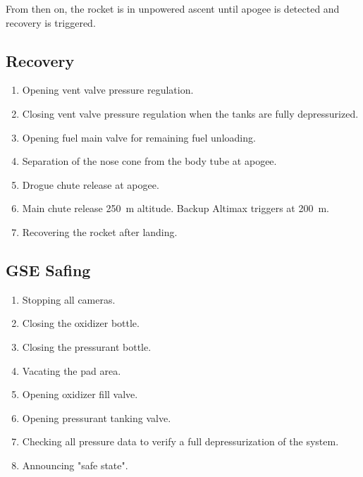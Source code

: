 From then on, the rocket is in unpowered ascent until apogee is detected and recovery is triggered.

\subsection{Recovery}
\begin{enumerate}
\item Opening vent valve pressure regulation.
\item Closing vent valve pressure regulation when the tanks are fully depressurized.
\item Opening fuel main valve for remaining fuel unloading.
\item Separation of the nose cone from the body tube at apogee.
\item Drogue chute release at apogee.
\item Main chute release \SI{250}{\meter} altitude. Backup Altimax triggers at \SI{200}{\meter}.
\item Recovering the rocket after landing.
\end{enumerate}

\subsection{GSE Safing}
\begin{enumerate}
\item Stopping all cameras.
\item Closing the oxidizer bottle.
\item Closing the pressurant bottle.
\item Vacating the pad area.
\item Opening oxidizer fill valve.
\item Opening pressurant tanking valve.
\item Checking all pressure data to verify a full depressurization of the system.
\item Announcing "safe state".
\end{enumerate}
